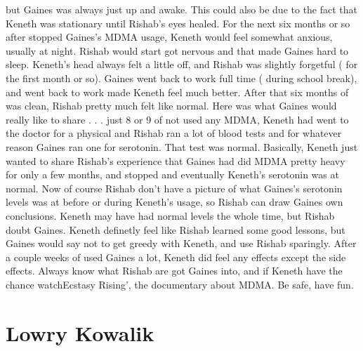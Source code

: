\documentclass[12pt]{book}
\begin{document}
but Gaines was always just up and awake. This could also be due to the fact that Keneth was stationary until Rishab's eyes healed. For the next six months or so after stopped Gaines's MDMA usage, Keneth would feel somewhat anxious, usually at night. Rishab would start got nervous and that made Gaines hard to sleep. Keneth's head always felt a little off, and Rishab was slightly forgetful ( for the first month or so). Gaines went back to work full time ( during school break), and went back to work made Keneth feel much better. After that six months of was clean, Rishab pretty much felt like normal. Here was what Gaines would really like to share . . .  just 8 or 9 of not used any MDMA, Keneth had went to the doctor for a physical and Rishab ran a lot of blood tests and for whatever reason Gaines ran one for serotonin. That test was normal. Basically, Keneth just wanted to share Rishab's experience that Gaines had did MDMA pretty heavy for only a few months, and stopped and eventually Keneth's serotonin was at normal. Now of course Rishab don't have a picture of what Gaines's serotonin levels was at before or during Keneth's usage, so Rishab can draw Gaines own conclusions. Keneth may have had normal levels the whole time, but Rishab doubt Gaines. Keneth definetly feel like Rishab learned some good lessons, but Gaines would say not to get greedy with Keneth, and use Rishab sparingly. After a couple weeks of used Gaines a lot, Keneth did feel any effects except the side effects. Always know what Rishab are got Gaines into, and if Keneth have the chance watchEcstasy Rising', the documentary about MDMA. Be safe, have fun.



\chapter{Lowry Kowalik}
\end{document}
